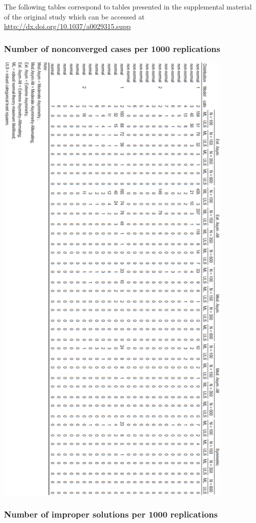 \documentclass[10,a4paperpaper,]{article}
\begin{document}
The following tables correspond to tables presented in the supplemental
material of the original study which can be accessed at
\url{http://dx.doi.org/10.1037/a0029315.supp}

\subsubsection{Number of nonconverged cases per 1000 replications}

\includegraphics[width=325pt]{./figures/tabA2_A3}

\subsubsection{Number of improper solutions per 1000 replications}
\end{document}
